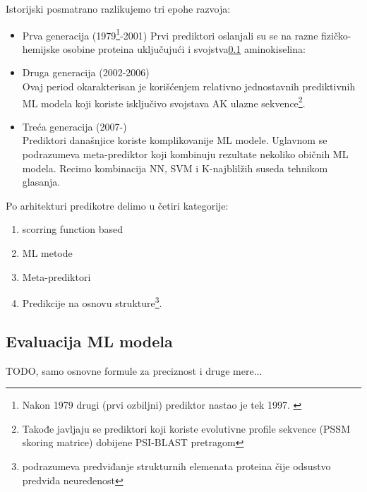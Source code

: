 Istorijski posmatrano razlikujemo tri epohe razvoja: \parencite{meng_c2017}
\begin{itemize}
  \item Prva generacija (1979\footnote{
      Nakon 1979 drugi (prvi ozbiljni) prediktor nastao je tek 1997. \parencite{meng_c2017}
    }-2001)
    Prvi prediktori oslanjali su se na razne fizičko-hemijske osobine proteina
    uključujući i svojstva\ref{} aminokiselina: 

  \item Druga generacija (2002-2006)\\
    Ovaj period okarakterisan je korišćenjem relativno jednostavnih
    prediktivnih ML modela koji koriste isključivo svojstava AK ulazne
    sekvence\footnote{ Takođe javljaju se prediktori koji koriste evolutivne
      profile sekvence (PSSM skoring matrice) dobijene PSI-BLAST pretragom}.

  \item Treća generacija (2007-)\\
    Prediktori današnjice koriste komplikovanije ML modele. Uglavnom  se
    podrazumeva meta-prediktor koji kombinuju rezultate nekoliko običnih ML
    modela. Recimo kombinacija NN, SVM i K-najblilžih suseda tehnikom
    glasanja.

\end{itemize}


Po arhitekturi predikotre delimo u četiri kategorije: \parencite{meng_c2017}
\begin{enumerate}
  \item
    scorring function based

  \item
    ML metode 

  \item
    Meta-prediktori

  \item
    Predikcije na osnovu strukture\footnote{podrazumeva predviđanje strukturnih
    elemenata proteina čije odsustvo predviđa neuređenost}.
\end{enumerate}


\subsection{Evaluacija ML modela}
TODO, samo osnovne formule za preciznost i druge mere...


